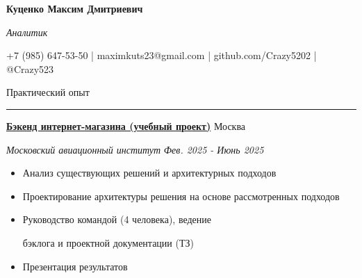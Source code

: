 \documentclass[14pt, a4paper, oneside]{extarticle}
\begin{document}



\begin{center}
    \textbf{\LARGE Куценко Максим Дмитриевич}
    
    \textit{\Large Аналитик}
\end{center}

\begin{center}
	\vspace{-0.5\intextsep}
	\small
    \faPhone* \space +7 (985) 647-53-50 | \faEnvelope \space maximkuts23@gmail.com | \faGithub \space github.com/Crazy5202 | \faTelegram \space @Crazy523
\end{center}


\begin{flushleft}
	\vspace{-\intextsep}
	\large Практический опыт
\end{flushleft}

\vspace{-0.8\intextsep}
\hrule


\begin{flushleft}
	\vspace{-0.8\intextsep}
	\quad
	\href{https://github.com/Crazy5202/eComm}{\textbf{Бэкенд интернет-магазина (учебный проект)}}
	\hfill
	Москва
\end{flushleft}

\begin{flushleft}
	\vspace{-1\intextsep}
	\quad
	\textit{Московский авиационный институт}
	\hfill
	\textit{\small Фев. 2025 - Июнь 2025}
\end{flushleft}


\begin{itemize}
	\vspace{-2\intextsep}
	\item Анализ существующих решений и архитектурных подходов
	\vspace{-0.8\intextsep}
	\item Проектирование архитектуры решения на основе рассмотренных подходов
	\vspace{-0.8\intextsep}
    \item Руководство командой (4 человека), ведение 

    \vspace{-0.5\intextsep}
    бэклога и проектной документации (ТЗ)
    \vspace{-0.8\intextsep}
    \item Презентация результатов
\end{itemize}
\end{document}
